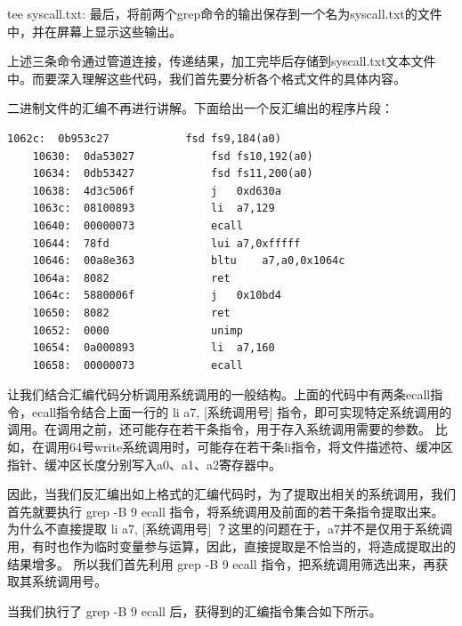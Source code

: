 tee syscall.txt: 最后，将前两个grep命令的输出保存到一个名为syscall.txt的文件中，并在屏幕上显示这些输出。

上述三条命令通过管道连接，传递结果，加工完毕后存储到syscall.txt文本文件中。而要深入理解这些代码，我们首先要分析各个格式文件的具体内容。

二进制文件的汇编不再进行讲解。下面给出一个反汇编出的程序片段：

\begin{lstlisting}[language={[RISC-V]Assembler}]
    1062c:	0b953c27          	fsd	fs9,184(a0)
    10630:	0da53027          	fsd	fs10,192(a0)
    10634:	0db53427          	fsd	fs11,200(a0)
    10638:	4d3c506f          	j	0xd630a
    1063c:	08100893          	li	a7,129
    10640:	00000073          	ecall
    10644:	78fd                lui	a7,0xfffff
    10646:	00a8e363          	bltu	a7,a0,0x1064c
    1064a:	8082                ret
    1064c:	5880006f          	j	0x10bd4
    10650:	8082                ret
    10652:	0000                unimp
    10654:	0a000893          	li	a7,160
    10658:	00000073          	ecall
\end{lstlisting}

让我们结合汇编代码分析调用系统调用的一般结构。上面的代码中有两条ecall指令，ecall指令结合上面一行的 li a7, [系统调用号] 指令，即可实现特定系统调用的调用。在调用之前，还可能存在若干条指令，用于存入系统调用需要的参数。
比如，在调用64号write系统调用时，可能存在若干条li指令，将文件描述符、缓冲区指针、缓冲区长度分别写入a0、a1、a2寄存器中。

因此，当我们反汇编出如上格式的汇编代码时，为了提取出相关的系统调用，我们首先就要执行 grep -B 9 ecall 指令，将系统调用及前面的若干条指令提取出来。
为什么不直接提取 li a7, [系统调用号] ？这里的问题在于，a7并不是仅用于系统调用，有时也作为临时变量参与运算，因此，直接提取是不恰当的，将造成提取出的结果增多。
所以我们首先利用 grep -B 9 ecall 指令，把系统调用筛选出来，再获取其系统调用号。

当我们执行了 grep -B 9 ecall 后，获得到的汇编指令集合如下所示。

